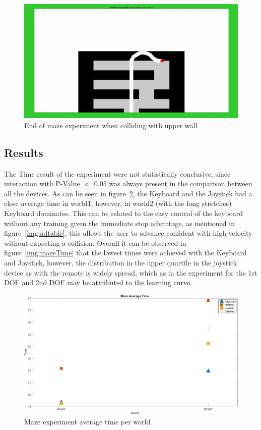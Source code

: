 \begin{figure}[ht]
   \centering
   \includegraphics[width=1.0\textwidth]{img/maze/mazeEnd.png}
   \caption{End of maze experiment when colliding with upper wall}
   \label{img:mazeEnd}
\end{figure}

\subsection{Results}\label{subsec:2ndres}
The Time result of the experiment were not statistically conclusive, since interaction with P-Value $<$ 0.05 was always present in the comparison between all the devices. As can be seen in figure~\ref{img:mazeAvgTime}, the Keyboard and the Joystick had a close average time in world1, however, in world2 (with the long stretches) Keyboard dominates. This can be related to the easy control of the keyboard without any training given the immediate stop advantage, as mentioned in figure~\ref{img:adtable}, this allows the user to advance confident with high velocity without expecting a collision. Overall it can be observed in figure~\ref{img:mazeTime} that the lowest times were achieved with the Keyboard and Joystick, however, the distribution in the upper quartile in the joystick device as with the remote is widely spread, which as in the experiment for the 1st DOF and 2nd DOF may be attributed to the learning curve.\\

\begin{figure}[ht]
   \centering
   \includegraphics[width=1.0\textwidth]{img/maze/mazeAvgTime.png}
   \caption{Maze experiment average time per world}
   \label{img:mazeAvgTime}
\end{figure}


